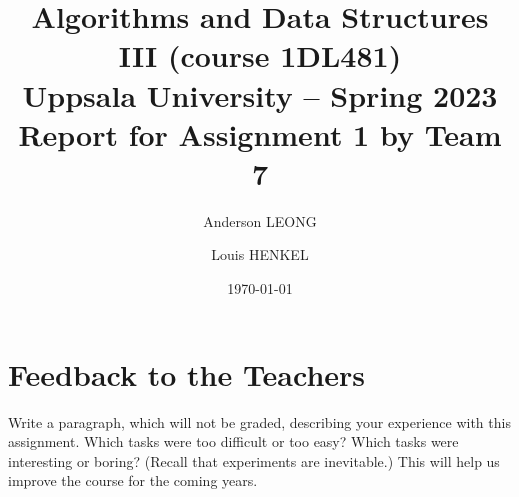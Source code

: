 \documentclass[a4paper,11pt,hidelinks]{article}
\title{\textbf{Algorithms and Data Structures III (course 1DL481) \\
    Uppsala University -- Spring 2023 \\
    Report for Assignment 1  %
    by Team 7}}              %
\author{Anderson LEONG \and Louis HENKEL}
\date{\today}
\newcommand{\todo}[1]{{\color{blue}#1}}  %
\begin{document}
\maketitle


  



\clearpage


% 

% 

\section*{Feedback to the Teachers}

\todo{Write a paragraph, which will not be graded, describing your
  experience with this assignment.  Which tasks were too difficult or
  too easy?  Which tasks were interesting or boring?  (Recall that
  experiments are inevitable.)  This will help us improve the course
  for the coming years.}



\todo{}
\end{document}
